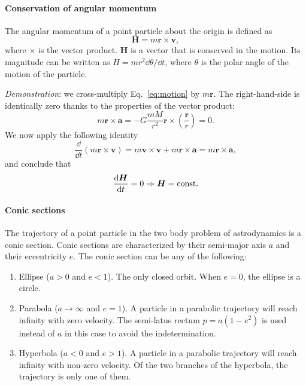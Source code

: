 \paragraph{Conservation of angular momentum}

The angular momentum of a point particle about the origin is defined as
%
\begin{equation}
\bm H = m\bm r \times \bm v,
\end{equation}
%
where $\times$ is the vector product. $\bm H$ is a vector that is conserved in 
the motion. Its magnitude can be written as $H=mr^2 \dd \theta/\dd t$, where 
$\theta$ is the polar angle of the motion of the particle.

\emph{Demonstration}: we cross-multiply Eq.~\eqref{eq:motion} by $m\bm r$. The 
right-hand-side is identically zero thanks to the properties of the vector 
product:
%
\begin{equation}
m\bm r\times \bm a
= - G\frac{mM}{r^2}\bm r\times \left(\frac{\bm r}{r}\right) = 0.
\end{equation}
%
We now apply the following identity
%
\begin{equation}
\frac{\dd}{\dd t}\left(m\bm r \times \bm v\right) 
= m \bm v \times \bm v + m\bm r \times \bm a =  m\bm r \times \bm a,
\end{equation}
%
and conclude that
%
\begin{equation}
\frac{\mathrm{d} \bm H}{\mathrm{d} t} = 0 \Rightarrow \bm H = \text{const}.
\end{equation}

\paragraph{Conic sections}

The trajectory of a point particle in the two body problem of astrodynamics
is a conic section. Conic sections are characterized by their semi-major axis 
$a$ and their eccentricity $e$. The conic section can be any of the following:
%
\begin{enumerate}
\item Ellipse ($a>0$ and $e<1$). The only closed orbit. When $e=0$, the 
ellipse is a circle.
\item Parabola ($a\to \infty$ and $e=1$). A particle in a parabolic trajectory 
will reach infinity with zero velocity. The semi-latus rectum $p=a(1-e^2)$ 
is used instead of $a$ in this case to avoid the indetermination.
\item Hyperbola ($a<0$ and $e>1$). A particle in a parabolic trajectory 
will reach infinity with non-zero velocity. Of the two branches of the 
hyperbola, the trajectory is only one of them.
\end{enumerate}
% 

